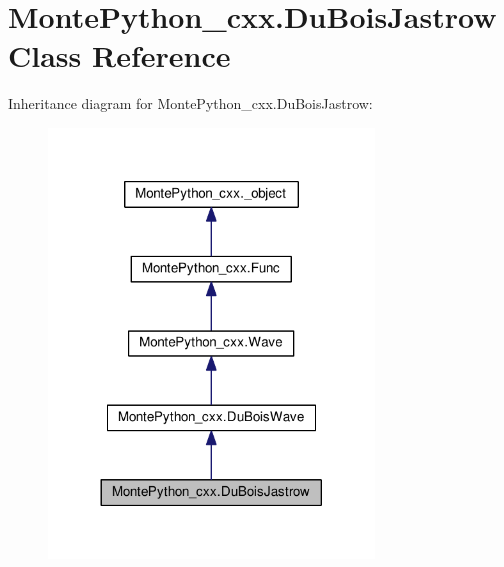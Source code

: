 \hypertarget{classMontePython__cxx_1_1DuBoisJastrow}{}\section{Monte\+Python\+\_\+cxx.\+Du\+Bois\+Jastrow Class Reference}
\label{classMontePython__cxx_1_1DuBoisJastrow}


Inheritance diagram for Monte\+Python\+\_\+cxx.\+Du\+Bois\+Jastrow\+:
\nopagebreak
\begin{figure}[H]
\begin{center}
\leavevmode
\includegraphics[width=245pt]{classMontePython__cxx_1_1DuBoisJastrow__inherit__graph}
\end{center}
\end{figure}


